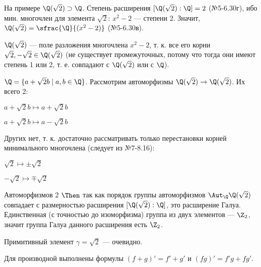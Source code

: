 \begin{solution}
На примере \(\Q(\sqrt{2}) \supset \Q\).
Степень расширения $[\Q(\sqrt{2}):\Q] = 2$ (№5-6.30г), ибо мин. многочлен для элемента $\sqrt2$: \(x^2-2\) --- степени 2. Значит, $\Q(\sqrt{2}) = \sfrac{\Q}{(x^2-2)}$ (№5-6.30в).

\(\Q(\sqrt2)\) --- поле разложения многочлена \(x^2-2\), т. к. все его корни \(\sqrt2, -\sqrt2 \in \Q(\sqrt2)\) (не существует промежуточных, потому что тогда они имеют степень 1 или 2, т. е. совпадают с \(\Q(\sqrt2)\) или с \(\Q\)).

$\Q = \{a+\sqrt2 b \mid a, b \in \Q\}$. Рассмотрим автоморфизмы \(\Q(\sqrt2) \to \Q(\sqrt2)\). Их всего 2:

\(a+\sqrt2b \mapsto a+\sqrt2b\)

\(a+\sqrt2b \mapsto a-\sqrt2b\)

Других нет, т. к. достаточно рассматривать только перестановки корней минимального многочлена (следует из №7-8.16):

\(\sqrt2 \mapsto \pm \sqrt2\)

\(-\sqrt2 \mapsto \mp \sqrt2\)


Автоморфизмов 2 \(\Then\) так как порядок группы автоморфизмов $\Aut_\Q \Q(\sqrt2)$ совпадает с размерностью расширения $[\Q(\sqrt2):\Q]$, это расширение Галуа. Единственная (с точностью до изоморфизма) группа из двух элементов --- \(\Z_2\), значит группа Галуа данного расширения есть $\Z_2$.

Примитивный элемент $\gamma = \sqrt{2}$ --- очевидно.
\end{solution}

\begin{problem}[36(9.1)]
Для производной выполнены формулы $(f+g)'=f'+g'$ и $(fg)' = f'g+fg'$.
\end{problem}

